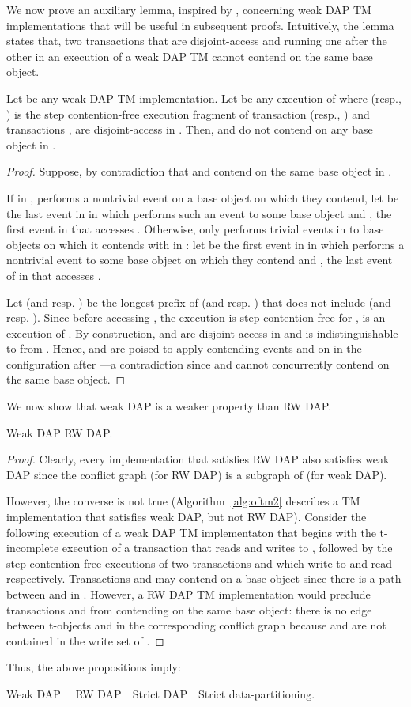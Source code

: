 We now prove an auxiliary lemma, inspired by \cite{AHM09}, concerning weak DAP TM implementations 
that will be useful in subsequent proofs. Intuitively, the lemma states that, two transactions that are disjoint-access
and running one after the other in an execution of a weak DAP TM cannot contend on the same base object.
\begin{lemma}
\label{lm:dap}
Let  be any weak DAP TM implementation.
Let  be any execution of  where
 (resp., ) is the step contention-free
execution fragment of transaction  (resp., ) 
and transactions ,  are disjoint-access in . 
Then,  and  do not contend on any base object in .
\end{lemma}
\begin{proof}
Suppose, by contradiction that  and  contend on the same base object in .

If in ,  performs a nontrivial event on a base object on which they contend, let  be the last
event in  in which  performs such an event to some base object  and , the first event
in  that accesses .
Otherwise, 
only performs trivial events in  to base objects on which it contends with  in :
let  be the first event in  in which  performs a nontrivial event to some base object 
on which they contend and , the last event of  in  that accesses .

Let  (and resp. ) be the longest prefix of  (and resp. ) that does not include
 (and resp. ).
Since before accessing , the execution is step contention-free for ,  is an execution of .
By construction,  and  are disjoint-access in 
and  is indistinguishable to  from .
Hence,  and
 are poised to apply contending events  and  on  in the configuration after 
---a contradiction since  and  cannot concurrently contend on the same base object.   
\end{proof}
We now show that weak DAP is a weaker property than RW DAP.
\begin{proposition}
Weak DAP  RW DAP.
\end{proposition}
\begin{proof}
Clearly, every implementation that satisfies RW DAP also satisfies weak DAP since the conflict graph
 (for RW DAP) is a subgraph of  (for weak DAP).

However, the converse is not true (Algorithm~\ref{alg:oftm2} describes a TM implementation that 
satisfies weak DAP, but not RW DAP).
Consider the following execution  of a weak DAP TM implementaton  
that begins with the t-incomplete execution of a transaction  that 
reads  and writes to , followed by the step contention-free executions of two transactions  and  
which write to  and read  respectively. Transactions  and  may contend on a base object since 
there is a path between  and  in . However, a RW DAP TM implementation
would preclude transactions  and  from contending on the same base object: there is no edge
between t-objects  and  in the corresponding conflict graph  because
 and  are not contained in the write set of .
\end{proof}
Thus, the above propositions imply:
\begin{corollary}
Weak DAP~~ RW DAP~~Strict DAP~~Strict data-partitioning.
\end{corollary}
